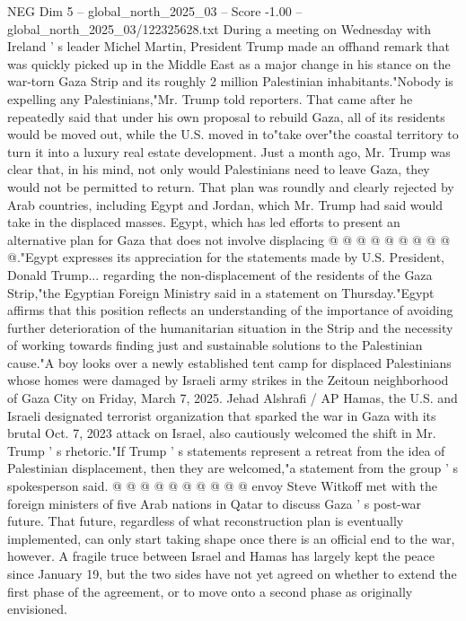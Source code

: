 \begin{textsample}{NEG Dim 5 – global\_north\_2025\_03 – Score -1.00 – global\_north\_2025\_03/122325628.txt}  \label{ex:f5_neg_255}
During a meeting on Wednesday with Ireland ' s leader Michel Martin, President Trump made an offhand remark that was quickly picked up in the Middle East as a major change in his stance on the war-torn Gaza Strip and its roughly 2 million Palestinian inhabitants."Nobody is expelling any Palestinians,"Mr.
Trump told reporters.
That came after he repeatedly said that under his own proposal to rebuild Gaza, all of its residents would be moved out, while the U.S. moved in to"take over"the coastal territory to turn it into a luxury real estate development.
Just a month ago, Mr.
Trump was clear that, in his mind, not only would Palestinians need to leave Gaza, they would not be permitted to return.
That plan was roundly and clearly rejected by Arab countries, including Egypt and Jordan, which Mr.
Trump had said would take in the displaced masses.
Egypt, which has led efforts to present an alternative plan for Gaza that does not involve displacing @ @ @ @ @ @ @ @ @ @."Egypt expresses its appreciation for the statements made by U.S.
President, Donald Trump... regarding the non-displacement of the residents of the Gaza Strip,"the Egyptian Foreign Ministry said in a statement on Thursday."Egypt affirms that this position reflects an understanding of the importance of avoiding further deterioration of the humanitarian situation in the Strip and the necessity of working towards finding just and sustainable solutions to the Palestinian cause."A boy looks over a newly established tent camp for displaced Palestinians whose homes were damaged by Israeli army strikes in the Zeitoun neighborhood of Gaza City on Friday, March 7, 2025.
Jehad Alshrafi / AP Hamas, the U.S. and Israeli designated terrorist organization that sparked the war in Gaza with its brutal Oct. 7, 2023 attack on Israel, also cautiously welcomed the shift in Mr.
Trump ' s rhetoric."If Trump ' s statements represent a retreat from the idea of Palestinian displacement, then they are welcomed,"a statement from the group ' s spokesperson said. @ @ @ @ @ @ @ @ @ @ envoy Steve Witkoff met with the foreign ministers of five Arab nations in Qatar to discuss Gaza ' s post-war future.
That future, regardless of what reconstruction plan is eventually implemented, can only start taking shape once there is an official end to the war, however.
A fragile truce between Israel and Hamas has largely kept the peace since January 19, but the two sides have not yet agreed on whether to extend the first phase of the agreement, or to move onto a second phase as originally envisioned.

\end{textsample}
